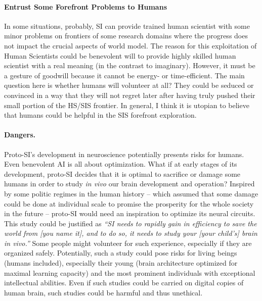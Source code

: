 \documentclass[a4paper,11pt]{article}
\begin{document}
\paragraph{Entrust Some Forefront Problems to Humans}
In some situations, probably, SI can provide trained human scientist with some minor problems on frontiers of some research domains where the progress does not impact the crucial aspects of world model. The reason for this exploitation of Human Scientists could be benevolent will to provide highly skilled human scientist with a real meaning (in the contrast to imaginary). However, it must be a gesture of goodwill because it cannot be  energy- or time-efficient. The main question here is whether humans will volunteer at all? They could be seduced or convinced in a way that they will not regret later after having truly pushed their small portion of the HS/SIS frontier. In general, I think it is utopian to believe that humans could be helpful in the SIS forefront exploration. 

\paragraph{Dangers.} Proto-SI's development in neuroscience potentially presents risks for humans. Even benevolent AI is all about optimization. What if at early stages of its development, proto-SI decides that it is optimal to sacrifice or damage some humans in order to study \emph{in vivo} our brain development and operation? Inspired by some politic regimes in the human history -- which assumed that some damage could be done at individual scale to promise the prosperity for the whole society in the future -- proto-SI would need an inspiration to optimize its neural circuits. This study could be justified as \textit{``SI needs to rapidly gain in efficiency to save the world from [you name it], and to do so, it needs to study your [your child's] brain in vivo.''} 
Some people might volunteer for such experience, especially if they are organized safely.
Potentially, such a study could pose risks for living beings (humans included), especially their young (brain architecture optimized for maximal learning capacity) and the most prominent individuals with exceptional intellectual abilities. Even if such studies could be carried on digital copies of human brain, such studies could be harmful and thus unethical.
\end{document}
